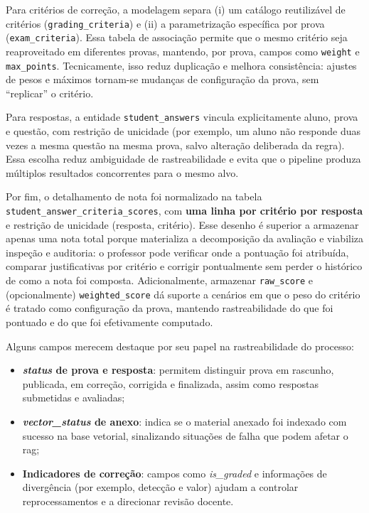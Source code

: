 Para critérios de correção, a modelagem separa (i) um catálogo reutilizável de critérios (\texttt{grading\_criteria}) e (ii) a parametrização específica por prova (\texttt{exam\_criteria}). Essa tabela de associação permite que o mesmo critério seja reaproveitado em diferentes provas, mantendo, por prova, campos como \texttt{weight} e \texttt{max\_points}. Tecnicamente, isso reduz duplicação e melhora consistência: ajustes de pesos e máximos tornam-se mudanças de configuração da prova, sem “replicar” o critério.

Para respostas, a entidade \texttt{student\_answers} vincula explicitamente aluno, prova e questão, com restrição de unicidade (por exemplo, um aluno não responde duas vezes a mesma questão na mesma prova, salvo alteração deliberada da regra). Essa escolha reduz ambiguidade de rastreabilidade e evita que o pipeline produza múltiplos resultados concorrentes para o mesmo alvo.

Por fim, o detalhamento de nota foi normalizado na tabela \texttt{student\_\allowbreak answer\_\allowbreak criteria\_\allowbreak scores}, com \textbf{uma linha por critério por resposta} e restrição de unicidade (resposta, critério). Esse desenho é superior a armazenar apenas uma nota total porque materializa a decomposição da avaliação e viabiliza inspeção e auditoria: o professor pode verificar onde a pontuação foi atribuída, comparar justificativas por critério e corrigir pontualmente sem perder o histórico de como a nota foi composta. Adicionalmente, armazenar \texttt{raw\_\allowbreak score} e (opcionalmente) \texttt{weighted\_\allowbreak score} dá suporte a cenários em que o peso do critério é tratado como configuração da prova, mantendo rastreabilidade do que foi pontuado e do que foi efetivamente computado.

Alguns campos merecem destaque por seu papel na rastreabilidade do processo:

\begin{itemize}
    \item \textbf{\textit{status} de prova e resposta}: permitem distinguir prova em rascunho, publicada, em correção, corrigida e finalizada, assim como respostas submetidas e avaliadas;
    \item \textbf{\textit{vector\_status} de anexo}: indica se o material anexado foi indexado com sucesso na base vetorial, sinalizando situações de falha que podem afetar o \gls{rag};
    \item \textbf{Indicadores de correção}: campos como \textit{is\_graded} e informações de divergência (por exemplo, detecção e valor) ajudam a controlar reprocessamentos e a direcionar revisão docente.
\end{itemize}

